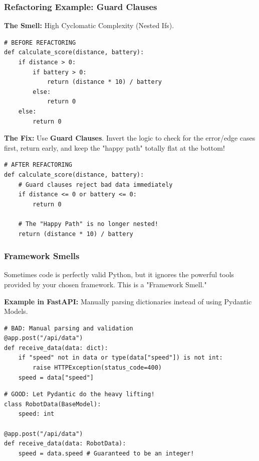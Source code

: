 \documentclass[xcolor=table]{beamer}
\begin{document}
\begin{frame}[fragile]
    \frametitle{Refactoring Example: Guard Clauses}
    \textbf{The Smell:} High Cyclomatic Complexity (Nested Ifs).
    
    \begin{verbatim}
# BEFORE REFACTORING
def calculate_score(distance, battery):
    if distance > 0:
        if battery > 0:
            return (distance * 10) / battery
        else:
            return 0
    else:
        return 0
    \end{verbatim}
    \pause
    \textbf{The Fix:} Use \textbf{Guard Clauses}. Invert the logic to check for the error/edge cases first, return early, and keep the "happy path" totally flat at the bottom!

    \begin{verbatim}
# AFTER REFACTORING
def calculate_score(distance, battery):
    # Guard clauses reject bad data immediately
    if distance <= 0 or battery <= 0:
        return 0
        
    # The "Happy Path" is no longer nested!
    return (distance * 10) / battery
    \end{verbatim}
\end{frame}



\begin{frame}[fragile]
    \frametitle{Framework Smells}
    Sometimes code is perfectly valid Python, but it ignores the powerful tools provided by your chosen framework. This is a "Framework Smell."
    
    \vspace{0.2cm}
    \textbf{Example in FastAPI:} Manually parsing dictionaries instead of using Pydantic Models.
    
    \begin{verbatim}
# BAD: Manual parsing and validation
@app.post("/api/data")
def receive_data(data: dict):
    if "speed" not in data or type(data["speed"]) is not int:
        raise HTTPException(status_code=400)
    speed = data["speed"]
    \end{verbatim}
    \pause
    \begin{verbatim}
# GOOD: Let Pydantic do the heavy lifting!
class RobotData(BaseModel):
    speed: int

@app.post("/api/data")
def receive_data(data: RobotData):
    speed = data.speed # Guaranteed to be an integer!
    \end{verbatim}
\end{frame}
\end{document}
